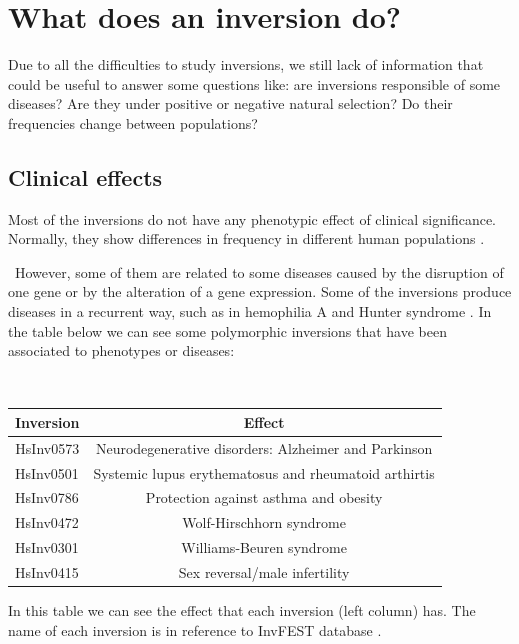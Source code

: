\documentclass[a4paper,12pt]{article}
\begin{document}
\section{What does an inversion do?}
Due to all the difficulties to study inversions, we still lack of information that could be useful to answer some questions like: are inversions responsible of some diseases? Are they under positive or negative natural selection? Do their frequencies change between populations?

\subsection{Clinical effects}
Most of the inversions do not have any phenotypic effect of clinical significance. Normally, they show differences in frequency in different human populations \cite{puig_human_2015}. 

\
However, some of them are related to some diseases caused by the disruption of one gene or by the alteration of a gene expression. Some of the inversions produce diseases in a recurrent way, such as in hemophilia A and Hunter syndrome \cite{puig_human_2015}. In the table below we can see some polymorphic inversions that have been associated to phenotypes or diseases:

\

\begin{table}[!htb] %
\centering
\begin{tabular}{|l|c|}
\hline
\multicolumn{1}{|c|}{\textbf{Inversion}} & \textbf{Effect}                                       \\ \hline
\multicolumn{1}{|c|}{HsInv0573}          & Neurodegenerative disorders: Alzheimer and Parkinson  \\ \hline
HsInv0501                                & Systemic lupus erythematosus and rheumatoid arthirtis \\ \hline
HsInv0786                                & Protection against asthma and obesity                 \\ \hline
HsInv0472                                & Wolf-Hirschhorn syndrome                              \\ \hline
HsInv0301                                & Williams-Beuren syndrome                              \\ \hline
HsInv0415                                & Sex reversal/male infertility                         \\ \hline
\end{tabular}
\begin{tablenotes}
\small
\item In this table we can see the effect that each inversion (left column) has. The name of each inversion is in reference to InvFEST database \cite{martinez-fundichely_invfest_2014}.
\end{tablenotes}
\end{table}
\end{document}
